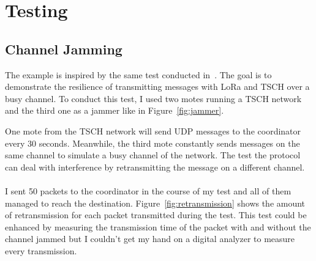 \section{Testing\label{section:tschtesting}}

\subsection{Channel Jamming}

The example is inspired by the same test conducted in~\cite{tschoverlora}.
The goal is to demonstrate the resilience of transmitting messages with LoRa and
TSCH over a busy channel.
To conduct this test, I used two motes running a TSCH network and the third one
as a jammer like in Figure~\ref{fig:jammer}.



One mote from the TSCH network will send UDP messages to the coordinator
every 30 seconds.
Meanwhile, the third mote constantly sends messages on the same channel to
simulate a busy channel of the network.
The test the protocol can deal with interference by retransmitting 
the message on a different channel.

\paragraph{}

I sent 50 packets to the coordinator in the course of my test and all of them
managed to reach the destination.
Figure~\ref{fig:retransmission} shows the amount of retransmission for each
packet transmitted during the test.
This test could be enhanced by measuring the transmission time of the packet
with and without the channel jammed but I couldn't get my hand on a digital
analyzer to measure every transmission.

